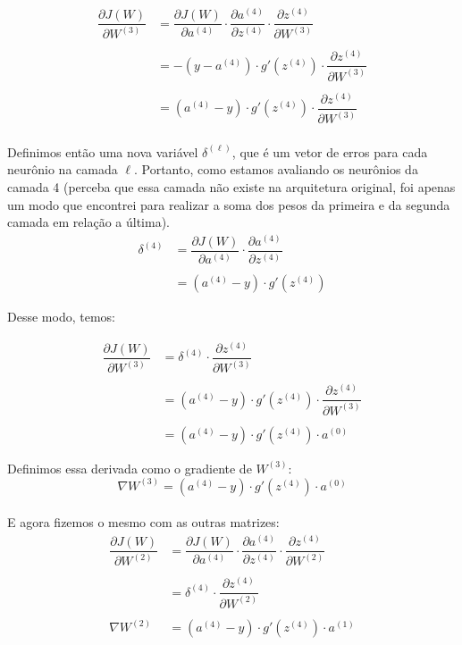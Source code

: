 \documentclass[10pt, a4paper]{article}
\begin{document}
\begin{align*} \nonumber
\dfrac{\partial J(W)}{\partial W^{(3)}} &= \dfrac{\partial J(W)}{\partial a^{(4)}} \cdot \dfrac{\partial a^{(4)}}{\partial z^{(4)}} \cdot \dfrac{\partial z^{(4)}}{\partial W^{(3)}} \\\\
\  &= -(y - a^{(4)}) \cdot g'(z^{(4)}) \cdot \dfrac{\partial z^{(4)}}{\partial W^{(3)}} \\\\
\  &= (a^{(4)} - y) \cdot g'(z^{(4)}) \cdot \dfrac{\partial z^{(4)}}{\partial W^{(3)}}
\end{align*}
\\
Definimos então uma nova variável $\delta^{(\ell)}$, que é um vetor de erros para cada neurônio na camada $\ell$. Portanto, como estamos avaliando os neurônios da camada 4 (perceba que essa camada não existe na arquitetura original, foi apenas um modo que encontrei para realizar a soma dos pesos da primeira e da segunda camada em relação a última). \\
\begin{align*} \nonumber
\delta^{(4)} &= \dfrac{\partial J(W)}{\partial a^{(4)}} \cdot \dfrac{\partial a^{(4)}}{\partial z^{(4)}} \\\\
\  &= (a^{(4)} - y) \cdot g'(z^{(4)})
\end{align*}

Desse modo, temos:

\begin{align*} \nonumber
\dfrac{\partial J(W)}{\partial W^{(3)}} &= \delta^{(4)} \cdot \dfrac{\partial z^{(4)}}{\partial W^{(3)}} \\\\
\  &= (a^{(4)} - y) \cdot g'(z^{(4)}) \cdot \dfrac{\partial z^{(4)}}{\partial W^{(3)}} \\\\
\  &= (a^{(4)} - y) \cdot g'(z^{(4)}) \cdot a^{(0)}
\end{align*}

Definimos essa derivada como o gradiente de $W^{(3)}$:
\begin{equation} \nonumber
\nabla W^{(3)} = (a^{(4)} - y) \cdot g'(z^{(4)}) \cdot a^{(0)}
\end{equation}
\\
E agora fizemos o mesmo com as outras matrizes:
\begin{align*} \nonumber
\dfrac{\partial J(W)}{\partial W^{(2)}} &= \dfrac{\partial J(W)}{\partial a^{(4)}} \cdot \dfrac{\partial a^{(4)}}{\partial z^{(4)}} \cdot \dfrac{\partial z^{(4)}}{\partial W^{(2)}} \\\\
\  &= \delta^{(4)} \cdot \dfrac{\partial z^{(4)}}{\partial W^{(2)}}  \\\\
\nabla W^{(2)} &= (a^{(4)} - y) \cdot g'(z^{(4)}) \cdot a^{(1)}
\end{align*}
\end{document}
